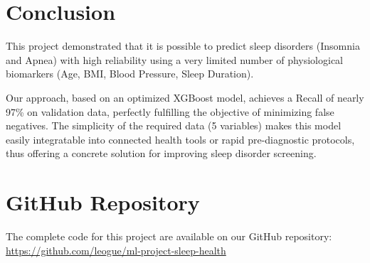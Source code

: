 \documentclass[12pt,a4paper]{article}
\begin{document}
    \section{Conclusion}
    This project demonstrated that it is possible to predict sleep disorders (Insomnia and Apnea) with high reliability using a very limited number of physiological biomarkers (Age, BMI, Blood Pressure, Sleep Duration).

    Our approach, based on an optimized XGBoost model, achieves a Recall of nearly 97\% on validation data, perfectly fulfilling the objective of minimizing false negatives. The simplicity of the required data (5 variables) makes this model easily integratable into connected health tools or rapid pre-diagnostic protocols, thus offering a concrete solution for improving sleep disorder screening.

    \section{GitHub Repository}
    The complete code for this project are available on our GitHub repository: \url{https://github.com/leogue/ml-project-sleep-health}
\end{document}
